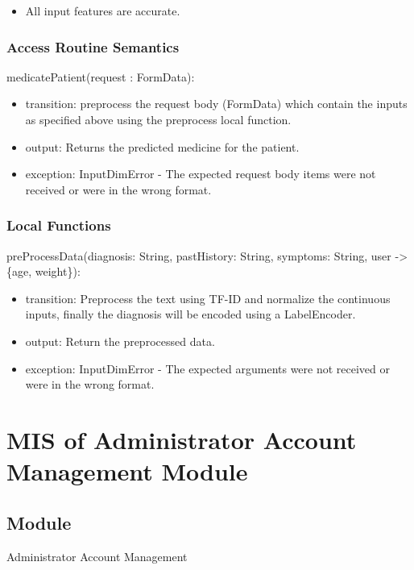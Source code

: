 \documentclass[12pt, titlepage]{article}
\begin{document}
\begin{itemize}
  \item All input features are accurate.
\end{itemize}

\subsubsection{Access Routine Semantics}

\noindent medicatePatient(request : FormData):
\begin{itemize}
\item transition: preprocess the request body (FormData) which contain the inputs as specified above using the preprocess local function. 
\item output: Returns the predicted medicine for the patient.
\item exception: InputDimError - The expected request body items were not received or were in the wrong format.
\end{itemize}

\subsubsection{Local Functions}

\noindent preProcessData(diagnosis: String, pastHistory: String, symptoms: String, user -> \{age, weight\}):
\begin{itemize}
\item transition: Preprocess the text using TF-ID and normalize the continuous inputs, finally the diagnosis will be encoded using a LabelEncoder.
\item output: Return the preprocessed data.
\item exception: InputDimError - The expected arguments were not received or were in the wrong format.
\end{itemize}

\newpage

\section{MIS of Administrator Account Management Module} \label{Admin_Account_Manag_Module}

\subsection{Module}
Administrator Account Management
\end{document}
